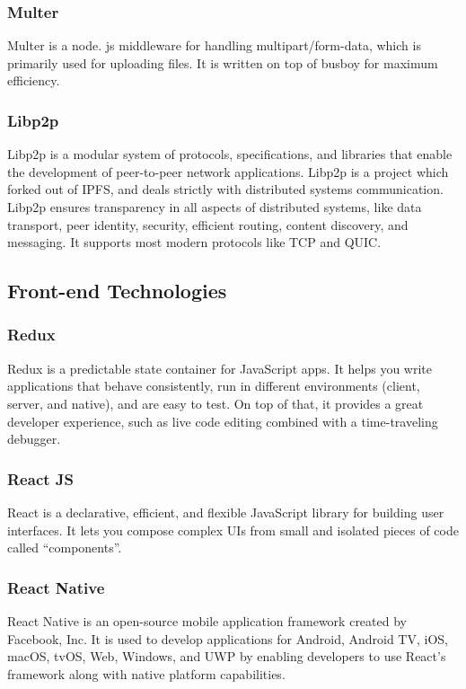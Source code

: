     \subsubsection{Multer}
    Multer is a node. js middleware for handling multipart/form-data, 
    which is primarily used for uploading files. It is written on top of busboy for maximum efficiency.

    \subsubsection{Libp2p}
    Libp2p is a modular system of protocols, specifications, and libraries that enable the development of peer-to-peer network applications. 
    Libp2p is a project which forked out of IPFS, and deals strictly with distributed systems communication. Libp2p ensures transparency in all aspects of distributed systems, like data transport, peer identity, security, efficient routing, content discovery, and messaging. It 
    supports most modern protocols like TCP and QUIC.

\subsection{Front-end Technologies}

    \subsubsection{Redux}
    Redux is a predictable state container for JavaScript apps.
    It helps you write applications that behave consistently, run in different environments 
    (client, server, and native), and are easy to test. On top of that, it provides a great developer experience, 
    such as live code editing combined with a time-traveling debugger.
    
    \subsubsection{React JS}
    React is a declarative, efficient, and flexible JavaScript library for building user interfaces. 
    It lets you compose complex UIs from small and isolated pieces of code called “components”.

    \subsubsection{React Native}
    React Native is an open-source mobile application framework created by Facebook, Inc.
    It is used to develop applications for Android, Android TV, iOS, macOS, tvOS, Web, Windows, and UWP by enabling developers to use React's framework along with native platform capabilities.

